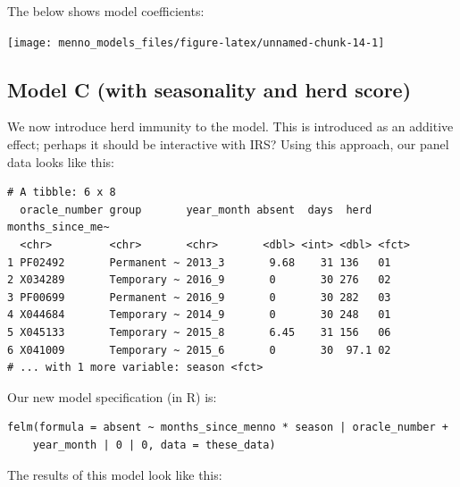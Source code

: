 \documentclass[]{article}
\begin{document}
The below shows model coefficients:

\begin{center}\texttt{[image: menno\_models\_files/figure-latex/unnamed-chunk-14-1]} \end{center}

\subsection{Model C (with seasonality and herd
score)}\label{model-c-with-seasonality-and-herd-score}

We now introduce herd immunity to the model. This is introduced as an
additive effect; perhaps it should be interactive with IRS? Using this
approach, our panel data looks like this:

\begin{verbatim}
# A tibble: 6 x 8
  oracle_number group       year_month absent  days  herd months_since_me~
  <chr>         <chr>       <chr>       <dbl> <int> <dbl> <fct>           
1 PF02492       Permanent ~ 2013_3       9.68    31 136   01              
2 X034289       Temporary ~ 2016_9       0       30 276   02              
3 PF00699       Permanent ~ 2016_9       0       30 282   03              
4 X044684       Temporary ~ 2014_9       0       30 248   01              
5 X045133       Temporary ~ 2015_8       6.45    31 156   06              
6 X041009       Temporary ~ 2015_6       0       30  97.1 02              
# ... with 1 more variable: season <fct>
\end{verbatim}

Our new model specification (in R) is:

\begin{verbatim}
felm(formula = absent ~ months_since_menno * season | oracle_number + 
    year_month | 0 | 0, data = these_data)
\end{verbatim}

The results of this model look like this:
\end{document}
